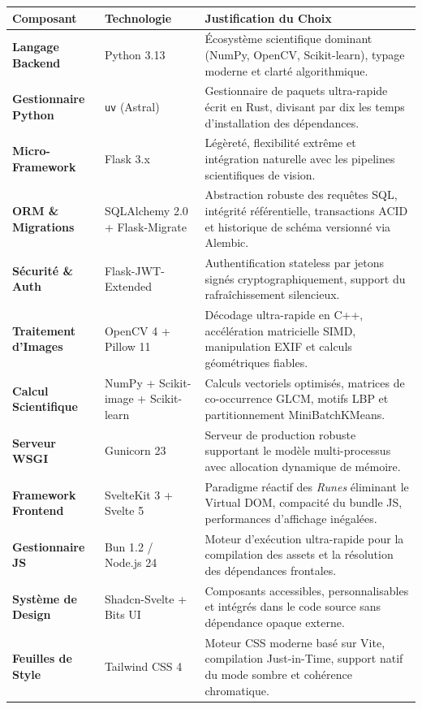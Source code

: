 \begin{table}[H]
\centering
{}
\begin{tabularx}{\textwidth}{>{\bfseries}p{3.2cm}p{3.2cm}X}
\toprule
\rowcolor{TableHeader}
\color{white}Composant & \color{white}Technologie & \color{white}Justification du Choix \\
\midrule
Langage Backend & Python 3.13 & Écosystème scientifique dominant (NumPy, OpenCV, Scikit-learn), typage moderne et clarté algorithmique. \\
Gestionnaire Python & \texttt{uv} (Astral) & Gestionnaire de paquets ultra-rapide écrit en Rust, divisant par dix les temps d'installation des dépendances. \\
Micro-Framework & Flask 3.x & Légèreté, flexibilité extrême et intégration naturelle avec les pipelines scientifiques de vision. \\
ORM \& Migrations & SQLAlchemy 2.0 + Flask-Migrate & Abstraction robuste des requêtes SQL, intégrité référentielle, transactions ACID et historique de schéma versionné via Alembic. \\
Sécurité \& Auth & Flask-JWT-Extended & Authentification stateless par jetons signés cryptographiquement, support du rafraîchissement silencieux. \\
Traitement d'Images & OpenCV 4 + Pillow 11 & Décodage ultra-rapide en C++, accélération matricielle SIMD, manipulation EXIF et calculs géométriques fiables. \\
Calcul Scientifique & NumPy + Scikit-image + Scikit-learn & Calculs vectoriels optimisés, matrices de co-occurrence GLCM, motifs LBP et partitionnement MiniBatchKMeans. \\
Serveur WSGI & Gunicorn 23 & Serveur de production robuste supportant le modèle multi-processus avec allocation dynamique de mémoire. \\
Framework Frontend & SvelteKit 3 + Svelte 5 & Paradigme réactif des \textit{Runes} éliminant le Virtual DOM, compacité du bundle JS, performances d'affichage inégalées. \\
Gestionnaire JS & Bun 1.2 / Node.js 24 & Moteur d'exécution ultra-rapide pour la compilation des assets et la résolution des dépendances frontales. \\
Système de Design & Shadcn-Svelte + Bits UI & Composants accessibles, personnalisables et intégrés dans le code source sans dépendance opaque externe. \\
Feuilles de Style & Tailwind CSS 4 & Moteur CSS moderne basé sur Vite, compilation Just-in-Time, support natif du mode sombre et cohérence chromatique. \\

\end{tabularx}
\end{table}
